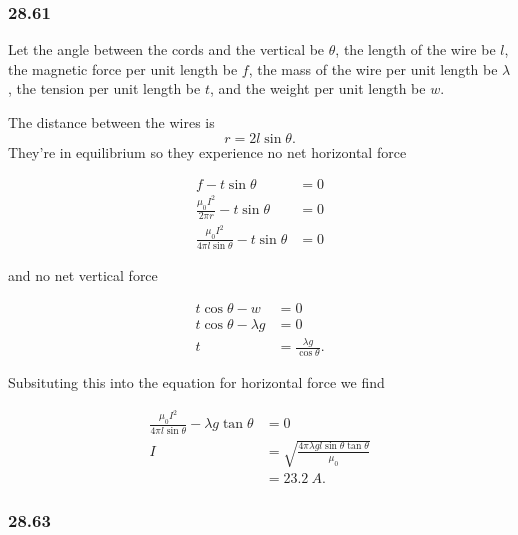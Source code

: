 \documentclass{article}
\begin{document}
\subsubsection{28.61}

Let the angle between the cords and the vertical be $\theta$, the length of the wire be $l$, the magnetic force per unit length be $f$, the mass of the wire per unit length be $\lambda$, the tension per unit length be $t$, and the weight per unit length be $w$.

The distance between the wires is \[r = 2 l \sin \theta.\] They're in equilibrium so they experience no net horizontal force

\begin{align*}
  f - t \sin \theta                                     & = 0 \\
  \frac{\mu_0 I^2}{2 \pi r} - t \sin \theta             & = 0 \\
  \frac{\mu_0 I^2}{4 \pi l \sin \theta} - t \sin \theta & = 0
\end{align*}

and no net vertical force

\begin{align*}
  t \cos \theta - w         & = 0                              \\
  t \cos \theta - \lambda g & = 0                              \\
  t                         & = \frac{\lambda g}{\cos \theta}.
\end{align*}

Subsituting this into the equation for horizontal force we find

\begin{align*}
  \frac{\mu_0 I^2}{4 \pi l \sin \theta} - \lambda g \tan \theta & = 0                                                              \\
  I                                                             & = \sqrt{\frac{4 \pi \lambda g l \sin \theta \tan \theta}{\mu_0}} \\
                                                                & = \qty{23.2}{A}.
\end{align*}

\subsubsection{28.63}
\end{document}
